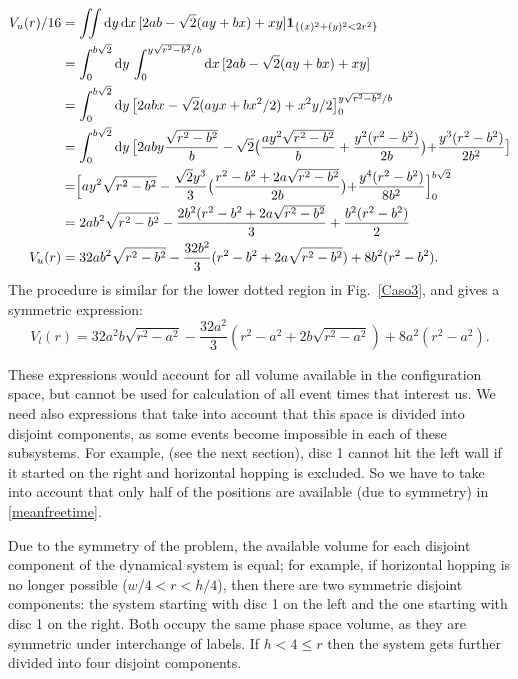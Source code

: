 \documentclass[superscriptaddress,pre,reprint,showpacs,twocolumn]{revtex4-1}
\newcommand{\rd}[1]{\mathrm{d}{#1} \,}
\newcommand{\indicatorsymbol}{\mathbf{1}}
\newcommand{\indicator}[1]{\indicatorsymbol_{ \{   #1 \} } }
\begin{document}
\begin{widetext}
\begin{equation} \label{app:voldot}
  \begin{split}
    V_{u}(r) /16 &=\iint \rd y \rd x [2ab-\sqrt{2}(ay+bx)+xy] \indicator{(x)^2+(y)^2<2r^2 }\\
    &=\int_0^{b\sqrt{2}}\rd y \int_{0}^{y\sqrt{r^2-b^2}/b} \rd x [2ab-\sqrt{2}(ay+bx)+xy] \\
   &=\int_0^{b\sqrt{2}}\rd y \bigl[2abx-\sqrt{2}(ayx+bx^2/2)+x^2y/2\bigr]_{0}^{y\sqrt{r^2-b^2}/b} \\
      &=\int_0^{b\sqrt{2}}\rd y
        \bigr[
          2aby\frac{\sqrt{r^2-b^2}}{b}
          -\sqrt{2}
          \bigr(
          \frac{ay^2\sqrt{r^2-b^2}}{b}
            +\frac{y^2(r^2-b^2)}{2b}
            \bigl)
           +\frac{y^3(r^2-b^2)}{2b^2}
           \bigl]\\
        &= \Bigr[ay^2\sqrt{r^2-b^2}-
          \frac{\sqrt{2}y^3}{3}
          \bigr(
          \frac{r^2-b^2+2a\sqrt{r^2-b^2}}{2b}
            \bigl)
            +\frac{y^4(r^2-b^2)}{8b^2}
            \Bigl]_0^{b\sqrt{2}}\\
          &=2ab^2\sqrt{r^2-b^2}
          -\frac{2b^2(r^2-b^2+2a\sqrt{r^2-b^2}}{3}+\frac{b^2(r^2-b^2)}{2}\\
          V_{u}(r)&=32ab^2\sqrt{r^2-b^2} -\frac{32
            b^2}{3}(r^2-b^2+2a\sqrt{r^2-b^2}) +8b^2(r^2-b^2).
  \end{split}
  \end{equation}
The procedure is similar for the lower dotted  region in Fig.~\ref{Caso3},
and gives a symmetric expression:
\begin{equation}
          V_{l}(r)=32a^2b\sqrt{r^2-a^2} -\frac{32
            a^2}{3}(r^2-a^2+2b\sqrt{r^2-a^2}) +8a^2(r^2-a^2).
\end{equation}
\end{widetext}

These expressions would account for all volume available in the configuration space, but
cannot be used for calculation of all event times that interest us. We need also
expressions that take into account that this space is divided into disjoint components,
as some events become impossible in each of these subsystems. For example,
(see the next section), disc 1 cannot hit the left wall if
it started on the right and horizontal hopping is excluded. So we have to
take into account that only half of the positions are available (due to symmetry)
 in \eqref{meanfreetime}.

Due to the symmetry of the problem, the available volume
for each disjoint component of the dynamical system is equal; for example, if horizontal hopping is no longer possible
($w/4<r<h/4$), then there are two symmetric disjoint components: the system
starting with disc 1 on the left and the one starting with disc 1 on
the right. Both occupy the same phase space volume, as they are
symmetric under interchange of labels. If $h<4\leq r$ then the system gets further
divided into four disjoint components. 
\end{document}
